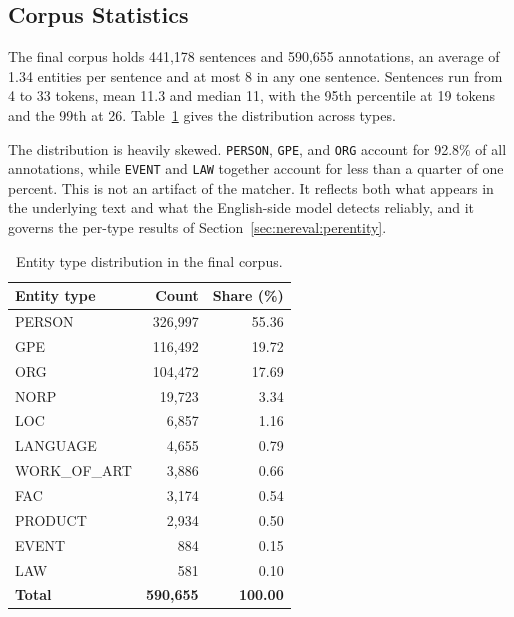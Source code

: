 \documentclass[acmsmall,screen,review]{acmart}
\begin{document}
\subsection{Corpus Statistics}
\label{sec:corpus:stats}

The final corpus holds 441,178 sentences and 590,655 annotations, an average of
1.34 entities per sentence and at most 8 in any one sentence. Sentences run from
4 to 33 tokens, mean 11.3 and median 11, with the 95th percentile at 19 tokens
and the 99th at 26. Table~\ref{tab:entity_distribution} gives the distribution
across types.

The distribution is heavily skewed. \texttt{PERSON}, \texttt{GPE}, and
\texttt{ORG} account for 92.8\% of all annotations, while \texttt{EVENT} and
\texttt{LAW} together account for less than a quarter of one percent. This is
not an artifact of the matcher. It reflects both what appears in the underlying
text and what the English-side model detects reliably, and it governs the
per-type results of Section~\ref{sec:nereval:perentity}.

\begin{table}[htbp]
\centering
\caption{Entity type distribution in the final corpus.}
\label{tab:entity_distribution}
\begin{tabular}{lrr}
\hline
\textbf{Entity type} & \textbf{Count} & \textbf{Share (\%)} \\
\hline
PERSON        & 326,997 & 55.36 \\
GPE           & 116,492 & 19.72 \\
ORG           & 104,472 & 17.69 \\
NORP          &  19,723 &  3.34 \\
LOC           &   6,857 &  1.16 \\
LANGUAGE      &   4,655 &  0.79 \\
WORK\_OF\_ART &   3,886 &  0.66 \\
FAC           &   3,174 &  0.54 \\
PRODUCT       &   2,934 &  0.50 \\
EVENT         &     884 &  0.15 \\
LAW           &     581 &  0.10 \\
\hline
\textbf{Total} & \textbf{590,655} & \textbf{100.00} \\
\hline
\end{tabular}
\end{table}

\end{document}
